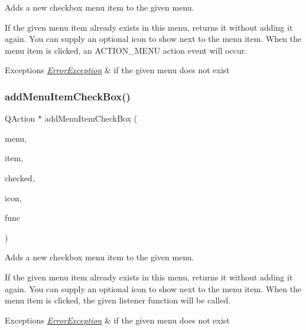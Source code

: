 Adds a new checkbox menu item to the given menu. 

If the given menu item already exists in this menu, returns it without adding it again. You can supply an optional icon to show next to the menu item. When the menu item is clicked, an A\+C\+T\+I\+O\+N\+\_\+\+M\+E\+NU action event will occur. 
\begin{DoxyExceptions}{Exceptions}
{\em \mbox{\hyperlink{classErrorException}{Error\+Exception}}} & if the given menu does not exist \\
\hline
\end{DoxyExceptions}
\mbox{\label{classGWindow_aab18d66dc7ed71468da3611b28450995}} 
\subsubsection{\texorpdfstring{add\+Menu\+Item\+Check\+Box()}{addMenuItemCheckBox()}\hspace{0.1cm}{\footnotesize\ttfamily [2/2]}}
{\footnotesize\ttfamily Q\+Action $\ast$ add\+Menu\+Item\+Check\+Box (\begin{DoxyParamCaption}\item[{const std\+::string \&}]{menu,  }\item[{const std\+::string \&}]{item,  }\item[{bool}]{checked,  }\item[{const std\+::string \&}]{icon,  }\item[{G\+Event\+Listener\+Void}]{func }\end{DoxyParamCaption})\hspace{0.3cm}{\ttfamily [virtual]}}



Adds a new checkbox menu item to the given menu. 

If the given menu item already exists in this menu, returns it without adding it again. You can supply an optional icon to show next to the menu item. When the menu item is clicked, the given listener function will be called. 
\begin{DoxyExceptions}{Exceptions}
{\em \mbox{\hyperlink{classErrorException}{Error\+Exception}}} & if the given menu does not exist \\
\hline
\end{DoxyExceptions}
\mbox{\label{classGWindow_abdf4f167a7135e31ecb8f3363fddfd19}} 
